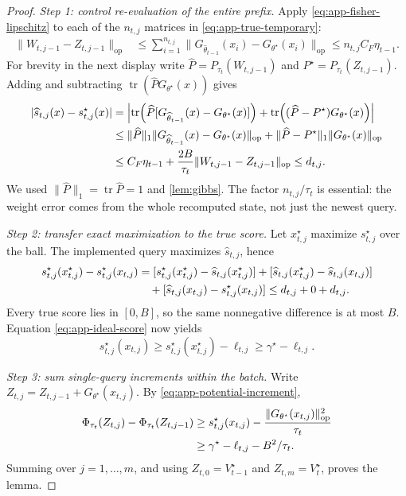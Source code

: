 \documentclass[10pt,twoside,letterpaper]{article}
\newcommand{\tr}{\operatorname{tr}}
\newcommand{\op}{\mathrm{op}}
\newcommand{\norm}[1]{\lVert #1\rVert}
\begin{document}
\begin{proof}
\textit{Step 1: control re-evaluation of the entire prefix.}
Apply \eqref{eq:app-fisher-lipschitz} to each of the $n_{t,j}$ matrices
in \eqref{eq:app-true-temporary}:
\begin{align}
\norm{W_{t,j-1}-Z_{t,j-1}}_{\op}
&\le\sum_{i=1}^{n_{t,j}}
\norm{G_{\widehat\theta_{t-1}}(x_i)-G_{\theta^\star}(x_i)}_{\op}
\le n_{t,j}C_F\eta_{t-1}.
\label{eq:app-state-error}
\end{align}
For brevity in the next display write
$\widehat P=P_{\tau_t}(W_{t,j-1})$ and
$P^\star=P_{\tau_t}(Z_{t,j-1})$.
Adding and subtracting $\tr(\widehat P G_{\theta^\star}(x))$ gives
\begin{align}
|\widehat s_{t,j}(x)-s_{t,j}^\star(x)|
&=\left|\tr\!\left(\widehat P
 [G_{\widehat\theta_{t-1}}(x)-G_{\theta^\star}(x)]\right)
 +\tr\!\left((\widehat P-P^\star)G_{\theta^\star}(x)\right)\right|\notag\\
&\le\norm{\widehat P}_1
\norm{G_{\widehat\theta_{t-1}}(x)-G_{\theta^\star}(x)}_{\op}
 +\norm{\widehat P-P^\star}_1\norm{G_{\theta^\star}(x)}_{\op}\notag\\
&\le C_F\eta_{t-1}
 +\frac{2B}{\tau_t}\norm{W_{t,j-1}-Z_{t,j-1}}_{\op}
\le d_{t,j}.
\label{eq:app-score-comparison}
\end{align}
We used $\norm{\widehat P}_1=\tr\widehat P=1$ and
\cref{lem:gibbs}. The factor $n_{t,j}/\tau_t$ is essential: the
weight error comes from the whole recomputed state, not just the
newest query.

\textit{Step 2: transfer exact maximization to the true score.}
Let $x_{t,j}^\star$ maximize $s_{t,j}^\star$ over the ball.
The implemented query maximizes $\widehat s_{t,j}$, hence
\begin{align}
s_{t,j}^\star(x_{t,j}^\star)-s_{t,j}^\star(x_{t,j})
&=[s_{t,j}^\star(x_{t,j}^\star)-\widehat s_{t,j}(x_{t,j}^\star)]
 +[\widehat s_{t,j}(x_{t,j}^\star)-\widehat s_{t,j}(x_{t,j})]\notag\\
&\hspace{1em}+[\widehat s_{t,j}(x_{t,j})-s_{t,j}^\star(x_{t,j})]
\le d_{t,j}+0+d_{t,j}.
\label{eq:app-argmax-transfer}
\end{align}
Every true score lies in $[0,B]$, so the same nonnegative difference
is at most $B$. Equation \eqref{eq:app-ideal-score} now yields
\begin{equation}
s_{t,j}^\star(x_{t,j})
\ge s_{t,j}^\star(x_{t,j}^\star)-\ell_{t,j}
\ge\gamma^\star-\ell_{t,j}.
\label{eq:app-selected-true-score}
\end{equation}

\textit{Step 3: sum single-query increments within the batch.}
Write $Z_{t,j}=Z_{t,j-1}+G_{\theta^\star}(x_{t,j})$.
By \eqref{eq:app-potential-increment},
\begin{align}
\Phi_{\tau_t}(Z_{t,j})-\Phi_{\tau_t}(Z_{t,j-1})
&\ge s_{t,j}^\star(x_{t,j})
 -\frac{\norm{G_{\theta^\star}(x_{t,j})}_{\op}^2}{\tau_t}\notag\\
&\ge\gamma^\star-\ell_{t,j}-B^2/\tau_t.
\label{eq:app-query-potential-gain}
\end{align}
Summing over $j=1,\ldots,m$, and using
$Z_{t,0}=V_{t-1}^\star$ and $Z_{t,m}=V_t^\star$, proves the lemma.
\end{proof}
\end{document}
